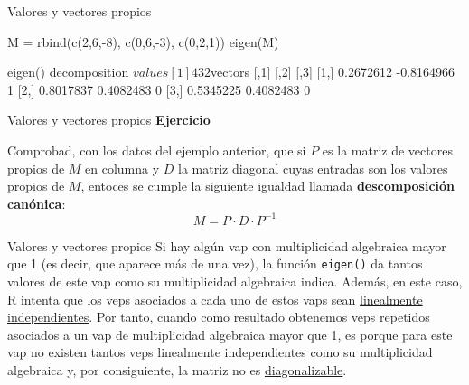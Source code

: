 \documentclass[
  ignorenonframetext,
  aspectratio=169]{beamer}
\newenvironment{Shaded}{\begin{snugshade}}{\end{snugshade}}
\newcommand{\DecValTok}[1]{\textcolor[rgb]{0.00,0.00,0.81}{#1}}
\newcommand{\FunctionTok}[1]{\textcolor[rgb]{0.00,0.00,0.00}{#1}}
\newcommand{\NormalTok}[1]{#1}
\newcommand{\OtherTok}[1]{\textcolor[rgb]{0.56,0.35,0.01}{#1}}
\newcommand{\SpecialCharTok}[1]{\textcolor[rgb]{0.00,0.00,0.00}{#1}}
\let\oldverbatim\verbatim
\let\endoldverbatim\endverbatim
\renewenvironment{verbatim}{\tiny\oldverbatim}{\endoldverbatim}
\begin{document}
\begin{frame}[fragile]{Valores y vectores propios}
\protect\hypertarget{valores-y-vectores-propios-1}{}
\begin{Shaded}
\begin{Highlighting}[]
\NormalTok{M }\OtherTok{=} \FunctionTok{rbind}\NormalTok{(}\FunctionTok{c}\NormalTok{(}\DecValTok{2}\NormalTok{,}\DecValTok{6}\NormalTok{,}\SpecialCharTok{{-}}\DecValTok{8}\NormalTok{), }\FunctionTok{c}\NormalTok{(}\DecValTok{0}\NormalTok{,}\DecValTok{6}\NormalTok{,}\SpecialCharTok{{-}}\DecValTok{3}\NormalTok{), }\FunctionTok{c}\NormalTok{(}\DecValTok{0}\NormalTok{,}\DecValTok{2}\NormalTok{,}\DecValTok{1}\NormalTok{))}
\FunctionTok{eigen}\NormalTok{(M)}
\end{Highlighting}
\end{Shaded}

\begin{verbatim}
eigen() decomposition
$values
[1] 4 3 2

$vectors
          [,1]       [,2] [,3]
[1,] 0.2672612 -0.8164966    1
[2,] 0.8017837  0.4082483    0
[3,] 0.5345225  0.4082483    0
\end{verbatim}
\end{frame}

\begin{frame}{Valores y vectores propios}
\protect\hypertarget{valores-y-vectores-propios-2}{}
\textbf{Ejercicio}

Comprobad, con los datos del ejemplo anterior, que si \(P\) es la matriz
de vectores propios de \(M\) en columna y \(D\) la matriz diagonal cuyas
entradas son los valores propios de \(M\), entoces se cumple la
siguiente igualdad llamada \textbf{descomposición canónica}:
\[M = P\cdot D\cdot P^{-1}\]
\end{frame}

\begin{frame}[fragile]{Valores y vectores propios}
\protect\hypertarget{valores-y-vectores-propios-3}{}
Si hay algún vap con multiplicidad algebraica mayor que 1 (es decir, que
aparece más de una vez), la función \texttt{eigen()} da tantos valores
de este vap como su multiplicidad algebraica indica. Además, en este
caso, R intenta que los veps asociados a cada uno de estos vaps sean
\href{https://es.wikipedia.org/wiki/Dependencia_e_independencia_lineal}{linealmente
independientes}. Por tanto, cuando como resultado obtenemos veps
repetidos asociados a un vap de multiplicidad algebraica mayor que 1, es
porque para este vap no existen tantos veps linealmente independientes
como su multiplicidad algebraica y, por consiguiente, la matriz no es
\href{https://es.wikipedia.org/wiki/Matriz_diagonalizable}{diagonalizable}.
\end{frame}
\end{document}
